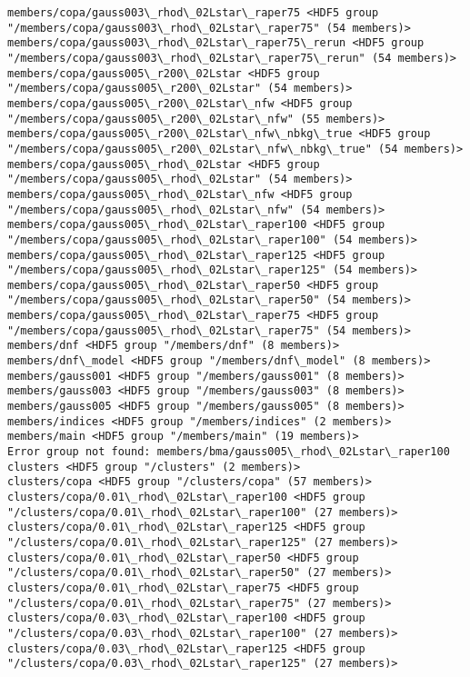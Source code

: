 \documentclass[11pt]{article}
\begin{document}
\begin{Verbatim}[commandchars=\\\{\}]
members/copa/gauss003\_rhod\_02Lstar\_raper75 <HDF5 group "/members/copa/gauss003\_rhod\_02Lstar\_raper75" (54 members)>
members/copa/gauss003\_rhod\_02Lstar\_raper75\_rerun <HDF5 group "/members/copa/gauss003\_rhod\_02Lstar\_raper75\_rerun" (54 members)>
members/copa/gauss005\_r200\_02Lstar <HDF5 group "/members/copa/gauss005\_r200\_02Lstar" (54 members)>
members/copa/gauss005\_r200\_02Lstar\_nfw <HDF5 group "/members/copa/gauss005\_r200\_02Lstar\_nfw" (55 members)>
members/copa/gauss005\_r200\_02Lstar\_nfw\_nbkg\_true <HDF5 group "/members/copa/gauss005\_r200\_02Lstar\_nfw\_nbkg\_true" (54 members)>
members/copa/gauss005\_rhod\_02Lstar <HDF5 group "/members/copa/gauss005\_rhod\_02Lstar" (54 members)>
members/copa/gauss005\_rhod\_02Lstar\_nfw <HDF5 group "/members/copa/gauss005\_rhod\_02Lstar\_nfw" (54 members)>
members/copa/gauss005\_rhod\_02Lstar\_raper100 <HDF5 group "/members/copa/gauss005\_rhod\_02Lstar\_raper100" (54 members)>
members/copa/gauss005\_rhod\_02Lstar\_raper125 <HDF5 group "/members/copa/gauss005\_rhod\_02Lstar\_raper125" (54 members)>
members/copa/gauss005\_rhod\_02Lstar\_raper50 <HDF5 group "/members/copa/gauss005\_rhod\_02Lstar\_raper50" (54 members)>
members/copa/gauss005\_rhod\_02Lstar\_raper75 <HDF5 group "/members/copa/gauss005\_rhod\_02Lstar\_raper75" (54 members)>
members/dnf <HDF5 group "/members/dnf" (8 members)>
members/dnf\_model <HDF5 group "/members/dnf\_model" (8 members)>
members/gauss001 <HDF5 group "/members/gauss001" (8 members)>
members/gauss003 <HDF5 group "/members/gauss003" (8 members)>
members/gauss005 <HDF5 group "/members/gauss005" (8 members)>
members/indices <HDF5 group "/members/indices" (2 members)>
members/main <HDF5 group "/members/main" (19 members)>
Error group not found: members/bma/gauss005\_rhod\_02Lstar\_raper100
clusters <HDF5 group "/clusters" (2 members)>
clusters/copa <HDF5 group "/clusters/copa" (57 members)>
clusters/copa/0.01\_rhod\_02Lstar\_raper100 <HDF5 group "/clusters/copa/0.01\_rhod\_02Lstar\_raper100" (27 members)>
clusters/copa/0.01\_rhod\_02Lstar\_raper125 <HDF5 group "/clusters/copa/0.01\_rhod\_02Lstar\_raper125" (27 members)>
clusters/copa/0.01\_rhod\_02Lstar\_raper50 <HDF5 group "/clusters/copa/0.01\_rhod\_02Lstar\_raper50" (27 members)>
clusters/copa/0.01\_rhod\_02Lstar\_raper75 <HDF5 group "/clusters/copa/0.01\_rhod\_02Lstar\_raper75" (27 members)>
clusters/copa/0.03\_rhod\_02Lstar\_raper100 <HDF5 group "/clusters/copa/0.03\_rhod\_02Lstar\_raper100" (27 members)>
clusters/copa/0.03\_rhod\_02Lstar\_raper125 <HDF5 group "/clusters/copa/0.03\_rhod\_02Lstar\_raper125" (27 members)>

\end{Verbatim}
\end{document}
